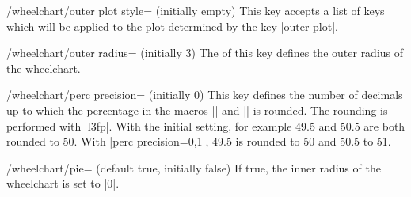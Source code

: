 \documentclass[a4paper,english,dvipsnames]{ltxdoc}
\begin{document}
\begin{stylekey}{/wheelchart/outer plot style= (initially \normalfont empty)}
This key accepts a list of keys which will be applied to the plot determined by the key |outer plot|.
\end{stylekey}
\begin{key}{/wheelchart/outer radius= (initially 3)}
The  of this key defines the outer radius of the wheelchart.
\end{key}
\begin{key}{/wheelchart/perc precision= (initially 0)}
This key defines the number of decimals up to which the percentage in the macros |\WCperc| and |\WCpercentagerounded| is rounded. The rounding is performed with |l3fp|. With the initial setting, for example \num{49.5} and \num{50.5} are both rounded to 50. With |perc precision={0,1}|, \num{49.5} is rounded to 50 and \num{50.5} to 51.
\end{key}
\begin{key}{/wheelchart/pie= (default true, initially false)}
If true, the inner radius of the wheelchart is set to |0|.
\end{key}
\end{document}

